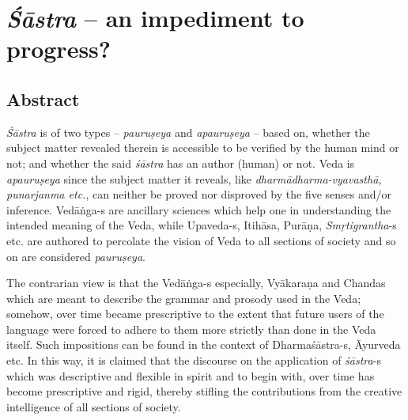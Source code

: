 \chapter{{{\sl\bfseries Śāstra}\relax} -- an impediment to progress?}\label{chapter5}
\vskip -10pt



\vskip -10pt


\section*{Abstract}

{\sl Śāstra} is of two types -- {\sl pauruṣeya} and {\sl apauruṣeya} --   based on, whether the subject matter revealed therein is accessible to be veriﬁed by the human mind or not; and whether the said {\sl śāstra} has an author (human) or not. Veda is {\sl apauruṣeya} since the subject matter it reveals, like {\sl dharmādharma-vyavasthā, punarjanma etc.}, can neither be proved nor disproved by the ﬁve senses and/or inference. Vedāṅga-s are ancillary sciences which help one in understanding the intended meaning of the Veda, while Upaveda-s, Itihāsa, Purāṇa, {\sl Smṛtigrantha}-s etc. are authored to percolate the vision of Veda to all sections of society and so on are considered {\sl pauruṣeya}.

The contrarian view is that the Vedāṅga-s especially, Vyākaraṇa and Chandas which are meant to describe the grammar and prosody used in the Veda; somehow, over time became prescriptive to the extent that future users of the language were forced to adhere to them more strictly than done in the Veda itself. Such impositions can be found in the context of Dharmaśāstra-s, Āyurveda etc. In this way, it is claimed that the discourse on the application of {\sl śāstra}-s which was descriptive and ﬂexible in spirit and to begin with, over time has become prescriptive and rigid, thereby stiﬂing the contributions from the creative intelligence of all sections of society.


